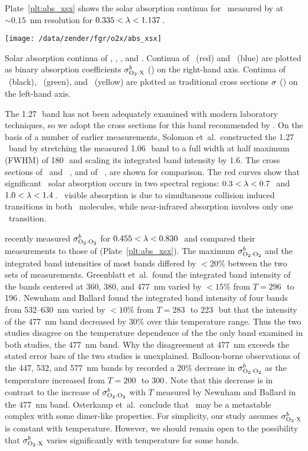 \documentclass[agupp,twoside]{aguplus} %
\newlength{\fltwdtdblclm}\setlength{\fltwdtdblclm}{41.0pc} %
\begin{document}
Plate~\ref{plt:abs_xsx} shows the solar absorption continua for
\OdX\ measured by \cite{GOB90} at $\sim 0.15$~nm resolution for $0.335
< \lambda < 1.137$\,\um. 
\begin{plate*}
\begin{center}
\texttt{[image: /data/zender/fgr/o2x/abs\_xsx]}\vfill
\end{center}
\caption{
Solar absorption continua of \OdX, \Ot, \Od, and \NOd.
Continua of \OdOd\ (red) and \OdNd\ (blue) are plotted as
binary absorption coefficients $\sigma^{b}_{\mathrm{O}_{2} \cdot \mathrm{X}}$ (\cmFxmlcS) on the right-hand
axis. 
Continua of \Ot\ (black), \NOd\ (green), and \Od\ (yellow) are
plotted as traditional cross sections $\sigma$ (\cmSxmlc) on the
left-hand axis.  
\label{plt:abs_xsx}}   
\end{plate*}
The 1.27\,\um\ band has not been adequately examined with modern
laboratory techniques, so we adopt the cross sections for this band
recommended by \cite{SPS98}. 
On the basis of a number of earlier measurements, Solomon et~al.\
constructed the 1.27\,\um\ band by stretching the measured 1.06\,\um\
band to a full width at half maximum (FWHM) of 180\,\xcm\ and scaling
its integrated band intensity by 1.6.
The cross sections of \Ot\ and \Od\ \cite[]{WMO85}, and of \NOd\
\cite[]{DCM88}, are shown for comparison.  
The red curves show that significant \OdOd\ solar absorption occurs in
two spectral regions: $0.3 < \lambda < 0.7$\,\um\ and $1.0 < \lambda <
1.4$\,\um. 
\OdOd\ visible absorption is due to simultaneous collision induced
transitions in both \Od\ molecules, while near-infrared absorption 
involves only one \Od\ transition.

\cite{NeB98} recently measured $\sigma^{b}_{\mathrm{O}_{2} \cdot \mathrm{O}_{2}}$ for $0.455 < \lambda <
0.830$\,\um\ and compared their measurements to those of \cite{GOB90}
(Plate~\ref{plt:abs_xsx}).  
The maximum $\sigma^{b}_{\mathrm{O}_{2} \cdot \mathrm{O}_{2}}$ and the integrated band intensities of
most bands differed by $< 20$\% between the two sets of
measurements. 
Greenblatt et~al.\ found the integrated band intensity of the bands
centered at 360, 380, and 477~nm varied by $< 15$\% from 
$T = 296$\,\K\ to 196\,\K.
Newnham and Ballard found the integrated band intensity of four bands
from 532--630~nm varied by $< 10$\% from $T = 283$\,\K\ to 223\,\K\
but that the intensity of the 477~nm band decreased by 30\% over this 
temperature range. 
Thus the two studies disagree on the temperature dependence of the
the only band examined in both studies, the 477~nm band. 
Why the disagreement at 477~nm exceeds the stated error bars of the
two studies is unexplained. 
Balloon-borne observations of the 447, 532, and 577~nm bands by
\cite{OFH98} recorded a 20\% decrease in $\sigma^{b}_{\mathrm{O}_{2} \cdot \mathrm{O}_{2}}$ as the
temperature increased from $T = 200$\,\K\ to 300\,\K. 
Note that this decrease is in contrast to the increase of $\sigma^{b}_{\mathrm{O}_{2} \cdot \mathrm{O}_{2}}$
with $T$ measured by Newnham and Ballard in the 477~nm band. 
Osterkamp et~al.\ conclude that \OdOd\ may be a metastable complex
with some dimer-like properties.
For simplicity, our study assumes $\sigma^{b}_{\mathrm{O}_{2} \cdot \mathrm{X}}$ is constant with
temperature.
However, we should remain open to the possibility that $\sigma^{b}_{\mathrm{O}_{2} \cdot \mathrm{X}}$
varies significantly with temperature for some bands.
\end{document}
